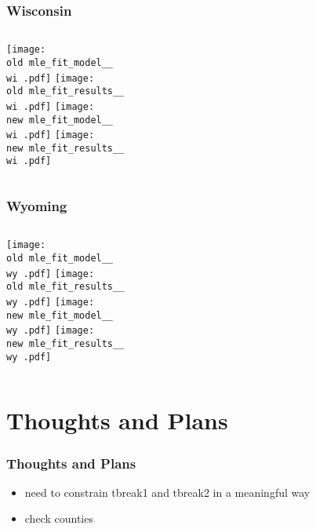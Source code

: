 \documentclass{beamer}
\newcommand{\old}{api-370-prod/pyseir/state_summaries/reports/}
\newcommand{\new}{new/pyseir/state_summaries/reports/}
\newcommand{\wi}{Wisconsin__55}
\newcommand{\wy}{Wyoming__56}
\begin{document}
\begin{frame}
\frametitle{Wisconsin}
    \begin{columns}[t]
       \texttt{[image: \\old mle\_fit\_model\_\_\\wi .pdf]}
       \texttt{[image: \\old mle\_fit\_results\_\_\\wi .pdf]}   
       \texttt{[image: \\new mle\_fit\_model\_\_\\wi .pdf]}
       \texttt{[image: \\new mle\_fit\_results\_\_\\wi .pdf]}   
\end{columns}
\end{frame}

\begin{frame}
\frametitle{Wyoming}
    \begin{columns}[t]
       \texttt{[image: \\old mle\_fit\_model\_\_\\wy .pdf]}
       \texttt{[image: \\old mle\_fit\_results\_\_\\wy .pdf]}   
       \texttt{[image: \\new mle\_fit\_model\_\_\\wy .pdf]}
       \texttt{[image: \\new mle\_fit\_results\_\_\\wy .pdf]}   
\end{columns}
\end{frame}

\iffalse


\fi

\section{Thoughts and Plans} %
\begin{frame}
\frametitle{Thoughts and Plans}
\begin{itemize}[label={-}]
\item need to constrain tbreak1 and tbreak2 in a meaningful way
\item check counties

\end{itemize}
\end{frame}
\end{document}
